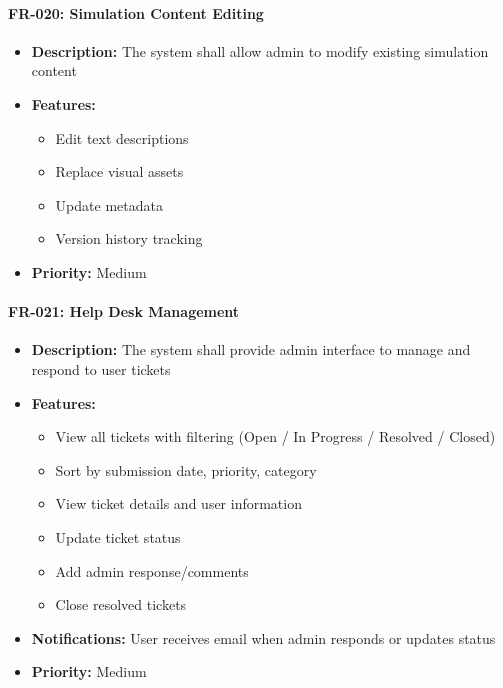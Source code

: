 \documentclass[12pt,a4paper]{article}
\begin{document}
\begin{enumerate}
\paragraph{FR-020: Simulation Content Editing}
\begin{itemize}
    \item \textbf{Description:} The system shall allow admin to modify existing simulation content
    \item \textbf{Features:}
    \begin{itemize}
        \item Edit text descriptions
        \item Replace visual assets
        \item Update metadata
        \item Version history tracking
    \end{itemize}
    \item \textbf{Priority:} Medium
\end{itemize}

\paragraph{FR-021: Help Desk Management}
\begin{itemize}
    \item \textbf{Description:} The system shall provide admin interface to manage and respond to user tickets
    \item \textbf{Features:}
    \begin{itemize}
        \item View all tickets with filtering (Open / In Progress / Resolved / Closed)
        \item Sort by submission date, priority, category
        \item View ticket details and user information
        \item Update ticket status
        \item Add admin response/comments
        \item Close resolved tickets
    \end{itemize}
    \item \textbf{Notifications:} User receives email when admin responds or updates status
    \item \textbf{Priority:} Medium
\end{itemize}


\end{enumerate}
\end{document}
